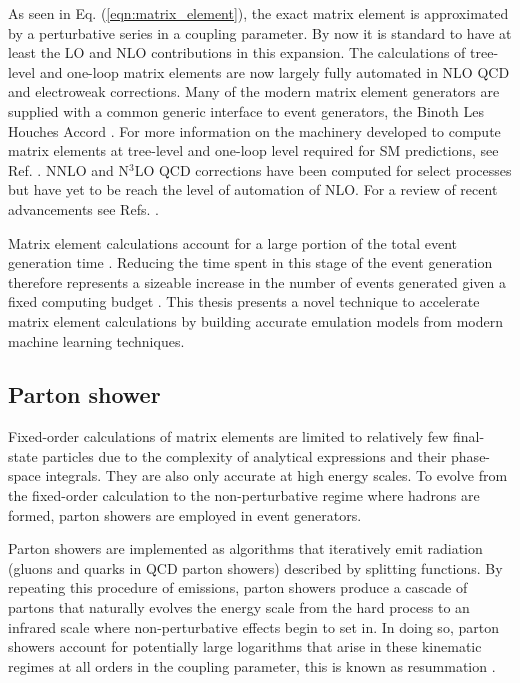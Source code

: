 \documentclass[main.tex]{subfiles}
\begin{document}
    As seen in Eq. (\ref{eqn:matrix_element}),
    the exact matrix element is approximated by a perturbative
    series in a coupling parameter. By now it is standard to
    have at least the LO and NLO contributions in this expansion.
    The calculations of
    tree-level \cite{Mangano:2002ea,Krauss:2001iv,Gleisberg:2008fv,Cafarella:2007pc,Alwall:2011uj,Kilian:2007gr}
    and one-loop \cite{Berger:2008sj,Cullen:2011ac,Cullen:2014yla,Bevilacqua:2011xh,Hirschi:2011pa,Alwall:2014hca,Frederix:2018nkq,Campbell:1999ah,Campbell:2021vlt,Badger:2012pg,Cascioli:2011va,Buccioni:2019sur,Actis:2016mpe,Denner:2017wsf}
    matrix elements are now largely fully automated
    in NLO QCD and electroweak corrections.
    Many of the modern matrix element generators are supplied
    with a common generic interface to event generators,
    the Binoth Les Houches Accord \cite{Binoth:2010xt,Alioli:2013nda}.
    For more information on the machinery developed to
    compute matrix elements at tree-level and
    one-loop level required for SM predictions, see Ref. \cite{Campbell:2017hsr}.
    NNLO and N$^{3}$LO QCD corrections have been computed
    for select processes but have yet to be reach the
    level of automation of NLO.
    For a review of recent advancements see Refs. \cite{Caola:2022ayt,Campbell:2022qmc}.
    
    Matrix element calculations account for a large
    portion of the total event generation time \cite{Bothmann:2022thx}.
    Reducing the time spent in this stage of the event
    generation therefore represents a sizeable increase
    in the number of events generated given a fixed computing
    budget \cite{HSFPhysicsEventGeneratorWG:2020gxw}.
    This thesis presents a novel technique to
    accelerate matrix element calculations by building
    accurate emulation models from modern machine learning
    techniques.

    \subsection*{Parton shower}\label{sec:parton_showers}
    Fixed-order calculations of matrix elements are limited
    to relatively few final-state particles due to the complexity
    of analytical expressions and their phase-space integrals.
    They are also only accurate at high energy scales.
    To evolve from the fixed-order
    calculation to the non-perturbative regime where hadrons
    are formed, parton showers are employed in event generators.

    Parton showers are implemented as algorithms that
    iteratively emit radiation (gluons and quarks in QCD
    parton showers) described by splitting functions.
    By repeating this procedure of emissions, parton
    showers produce a cascade of partons that naturally
    evolves the energy scale from the hard process to
    an infrared scale where non-perturbative effects
    begin to set in. In doing so, parton showers account
    for potentially large logarithms that arise in
    these kinematic regimes at all orders in the coupling
    parameter, this is known as resummation \cite{Buckley:2011ms}.
\end{document}
